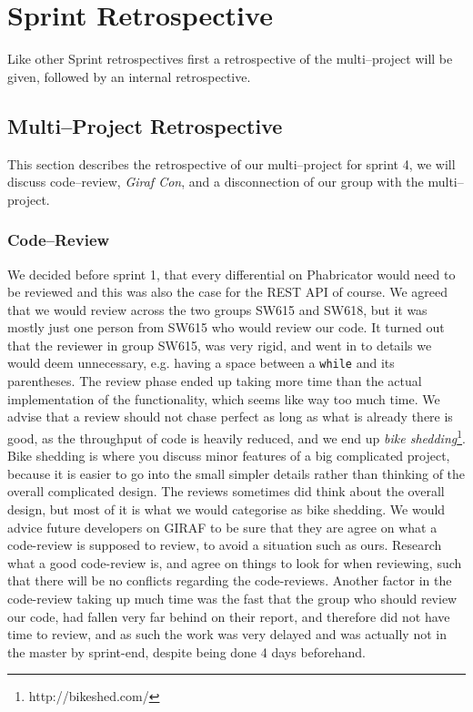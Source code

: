 \section{Sprint Retrospective}

Like other Sprint retrospectives first a retrospective of the multi--project will be given, followed by an internal retrospective.

\subsection*{Multi--Project Retrospective}
This section describes the retrospective of our multi--project for sprint 4, we will discuss code--review, \textit{Giraf Con}, and a disconnection of our group with the multi--project.

\subsubsection*{Code--Review}
We decided before sprint 1, that every differential on Phabricator would need to be reviewed and this was also the case for the REST API of course.
We agreed that we would review across the two groups SW615 and SW618, but it was mostly just one person from SW615 who would review our code.
It turned out that the reviewer in group SW615, was very rigid, and went in to details we would deem unnecessary, e.g. having a space between a \texttt{while} and its parentheses.
The review phase ended up taking more time than the actual implementation of the functionality, which seems like way too much time.
We advise that a review should not chase perfect as long as what is already there is good, as the throughput of code is heavily reduced, and we end up \textit{bike shedding}\footnote{http://bikeshed.com/}.
Bike shedding is where you discuss minor features of a big complicated project, because it is easier to go into the small simpler details rather than thinking of the overall complicated design.
The reviews sometimes did think about the overall design, but most of it is what we would categorise as bike shedding.
We would advice future developers on GIRAF to be sure that they are agree on what a code-review is supposed to review, to avoid a situation such as ours.
Research what a good code-review is, and agree on things to look for when reviewing, such that there will be no conflicts regarding the code-reviews.
Another factor in the code-review taking up much time was the fast that the group who should review our code, had fallen very far behind on their report, and therefore did not have time to review, and as such the work was very delayed and was actually not in the master by sprint-end, despite being done 4 days beforehand.


